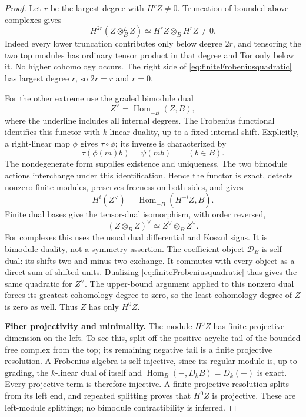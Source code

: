 \documentclass[11pt,a4paper]{article}
\newcommand{\mathscr}{\mathcal}
\theoremstyle{named}\newtheorem{finding}{Finding}[section]
\theoremstyle{definition}\newtheorem{definition}[finding]{Definition}
\theoremstyle{remark}\newtheorem{remark}[finding]{Remark}
\begin{document}
\begin{proof}
Let \(r\) be the largest degree with \(H^rZ\ne0\).
Truncation of bounded-above complexes gives
\begin{equation}\label{eq:FrobeniusTopTensor}
 H^{2r}(Z\otimes_B^L Z)
       \simeq H^rZ\otimes_B H^rZ\ne0.
\end{equation}
Indeed every lower truncation contributes only below degree
\(2r\), and tensoring the two top modules has ordinary tensor
product in that degree and Tor only below it. No higher
cohomology occurs. The right side of
\eqref{eq:finiteFrobeniusquadratic} has largest degree \(r\),
so \(2r=r\) and \(r=0\).

For the other extreme use the graded bimodule dual
\[
 Z^\vee=\underline{\operatorname{Hom}}_{-B}(Z,B),
\]
where the underline includes all internal degrees. The
Frobenius functional identifies this functor with \(k\)-linear
duality, up to a fixed internal shift. Explicitly, a right-linear
map \(\phi\) gives \(\tau\circ\phi\); its inverse is
characterized by
\[
                  \tau(\phi(m)b)=\psi(mb)\qquad(b\in B).
\]
The nondegenerate form supplies existence and uniqueness.
The two bimodule actions interchange under this identification.
Hence the functor is exact, detects nonzero finite modules,
preserves freeness on both sides, and gives
\[
 H^i(Z^\vee)=
 \underline{\operatorname{Hom}}_{-B}(H^{-i}Z,B).
\]
Finite dual bases give the tensor-dual isomorphism, with order
reversed,
\[
             (Z\otimes_B Z)^\vee
                 \simeq Z^\vee\otimes_B Z^\vee.
\]
For complexes this uses the usual dual differential and Koszul
signs. It is bimodule duality, not a symmetry assertion.
The coefficient object \(\mathscr D_B\) is self-dual: its
shifts two and minus two exchange. It commutes with every object
as a direct sum of shifted units. Dualizing
\eqref{eq:finiteFrobeniusquadratic} thus gives the same
quadratic for \(Z^\vee\). The upper-bound argument applied to
this nonzero dual forces its greatest cohomology degree to zero,
so the least cohomology degree of \(Z\) is zero as well.
Thus \(Z\) has only \(H^0Z\).

\par\smallskip\noindent\textbf{Fiber projectivity and minimality.}\quad
The module \(H^0Z\) has finite projective dimension on the
left. To see this, split off the positive acyclic tail of the
bounded free complex from the top; its remaining negative tail
is a finite projective resolution. A Frobenius algebra is
self-injective, since its regular module is, up to grading,
the \(k\)-linear dual of itself and
\(\operatorname{Hom}_B(-,D_kB)=D_k(-)\) is exact.
Every projective term is therefore injective. A finite
projective resolution splits from its left end, and repeated
splitting proves that \(H^0Z\) is projective. These are
left-module splittings; no bimodule contractibility is inferred.


\end{proof}
\end{document}
